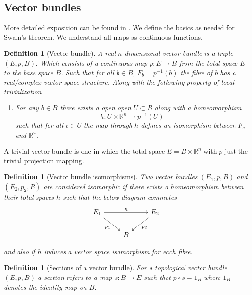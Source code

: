 \documentclass[12pt]{article}
\numberwithin{equation}{section}
\newcommand{\R}{\mathbb{R}}
\newcounter{dummy} \numberwithin{dummy}{section}
\newtheorem{definition}[dummy]{Definition}
\begin{document}
	\begin{appendices}
	
	
	\section{Vector bundles}
	More detailed exposition can be found in \cite{milnor1974characteristic}. We define the basics as needed for Swam's theorem. We understand all maps as continuous functions.
	\begin{definition}[Vector bundle]
		A real $n$ dimensional vector bundle is a triple $(E,p, B)$. Which consists of a continuous map $p:E \to B$ from the total space $E$ to the base space $B$. Such that for all $b \in B$, $F_b=p^{-1}(b)$ the fibre of $b$ has a real/complex vector space structure. Along with the following property of local trivialization
		\begin{enumerate}
			 \item For any $b \in B$ there exists a open open $U \subset B$ along with a homeomorphism \[ h: U \times \R^n	\to p^{-1}(U) \] such that for all $c \in U$ the map through $h$ defines an isomorphism between $F_c$ and $\R^n$.
		\end{enumerate}
	\end{definition}
	
	A trivial vector bundle is one in which the total space $E=B \times \R^n$ with $p$ just the trivial projection mapping.
	
	
	\begin{definition}[Vector bundle isomorphisms]
		Two vector bundles $(E_1,p, B)$ and $(E_2,p_2, B) $ are considered isomorphic if there exists a homeomorphism between their total spaces $h$ such that the below diagram commutes
		\[\begin{tikzcd}
			{E_1} && {E_2} \\
			& B
			\arrow["{p_1}"', from=1-1, to=2-2]
			\arrow["{p_2}", from=1-3, to=2-2]
			\arrow["h", from=1-1, to=1-3]
		\end{tikzcd}\]
		
		and also if $h$ induces a vector space isomorphism for each fibre.
	\end{definition}
	
	\begin{definition}[Sections of a vector bundle]
		For a topological vector bundle $(E,p,B)$ a section refers to a map	$s: B \to E$ such that $p \circ s= 1_B$ where $1_B$ denotes the identity map on $B$.
		

\end{definition}
\end{appendices}
\end{document}
